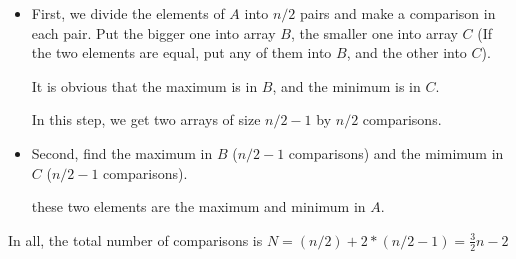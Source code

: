 \begin{itemize}
	\item First, we divide the elements of $A$ into $n/2$ pairs and make a comparison in each pair. Put the bigger one into array $B$, the smaller one into array $C$ 
	(If the two elements are equal, put any of them into $B$, and the other into $C$).

	It is obvious that the maximum is in $B$, and the minimum is in $C$.
	
	In this step, we get two arrays of size $n/2 - 1$ by $n/2$ comparisons.	
	\item Second, find the maximum in $B$ ($n/2 - 1$ comparisons) and the mimimum in $C$ ($n/2 - 1$ comparisons).
	
	these two elements are the maximum and minimum in $A$.
\end{itemize}

In all, the total number of comparisons is $N = (n / 2) + 2 * (n / 2 - 1) = \frac{3}{2}n - 2$

